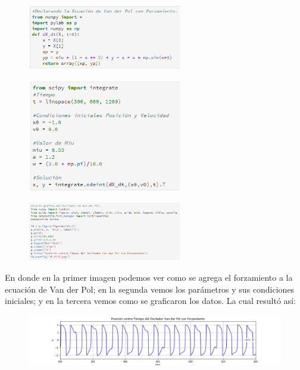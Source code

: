 \documentclass[a4paper]{article}
\begin{document}
\begin{figure}[ht!]
 \centering
  \includegraphics[width=0.6\textwidth]{Codigo8.PNG}
\end{figure}
\pagebreak
\begin{figure}[ht!]
 \centering
  \includegraphics[width=0.6\textwidth]{Codigo9.PNG}
\end{figure}
\begin{figure}[ht!]
 \centering
  \includegraphics[width=0.6\textwidth]{Codigo10.PNG}
\end{figure}

En donde en la primer imagen podemos ver como se agrega el forzamiento a la ecuación de Van der Pol; en la segunda vemos los parámetros y sus condiciones iniciales; y en la tercera vemos como se graficaron los datos. La cual resultó así:

\begin{figure}[ht!]
 \centering
  \includegraphics[width=\textwidth]{VP_PcT2.png}
\end{figure}
\end{document}
